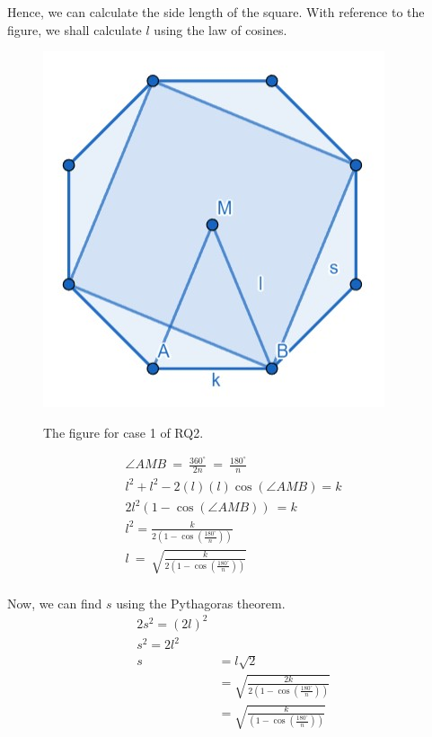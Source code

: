 \documentclass[12pt]{scrartcl}
\begin{document}
Hence, we can calculate the side length of the square. With reference to the figure, we shall calculate $l$ using the law of cosines. \\

\begin{figure}[h!]
	\centering
	\includegraphics[scale=.75]{images/rq2_1_2.jpg}
	\label{fig:rq2_1_2_img}
	\caption{The figure for case 1 of RQ2.}
\end{figure}

\begin{align*}
	\angle AMB\ =\ \frac{360^{\circ}}{2n}\ =\ \frac{180^{\circ}}{n}     \\
	l^{2}+l^{2}-2\left(l\right)\left(l\right)\cos\left(\angle AMB\right)=k    \\
	2l^{2}\left(1-\cos\left(\angle AMB\right)\right)\ =k           \\
	l^{2}=\frac{k}{2\left(1-\cos\left(\frac{180^{\circ}}{n}\right)\right)}   \\
	l\ =\ \sqrt{\frac{k}{2\left(1-\cos\left(\frac{180^{\circ}}{n}\right)\right)}}    \\
\end{align*}

Now, we can find $s$ using the Pythagoras theorem. \\

\begin{align*}
  2s^{2}=\left(2l\right)^{2}    \\
	s^{2}=2l^{2}   \\
	s & = l\sqrt{2}    \\
	& = \sqrt{\frac{2k}{2\left(1-\cos\left(\frac{180^{\circ}}{n}\right)\right)}} \\
	& = \sqrt{\frac{k}{\left(1-\cos\left(\frac{180^{\circ}}{n}\right)\right)}} \\
\end{align*}

\printbibliography
\end{document}
